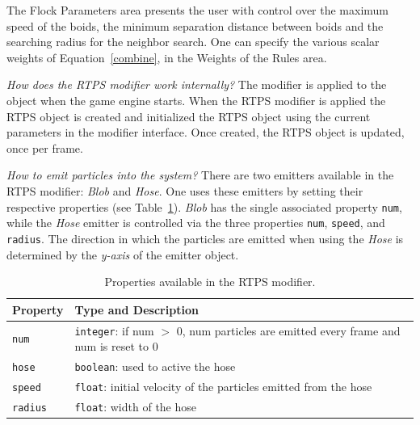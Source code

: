 The Flock Parameters area presents the user with control over the maximum speed of the boids, the minimum separation distance between boids and the searching radius for the neighbor search. One can specify the various scalar weights of Equation~\ref{combine}, in the Weights of the Rules area.

\textit{How does the RTPS modifier work internally?} The modifier is applied to the object when the game engine starts. When the RTPS modifier is applied the RTPS object is created and initialized the RTPS object using the current parameters in the modifier interface. Once created, the RTPS object is updated, once per frame. 

\textit{How to emit particles into the system?} There are two emitters available in the RTPS modifier: \textit{Blob} and \textit{Hose}. One uses these emitters by setting their respective properties (see Table~\ref{properties}). \textit{Blob} has the single associated property \texttt{num}, while the \textit{Hose} emitter is controlled via the three properties \texttt{num}, \texttt{speed}, and \texttt{radius}. The direction in which the particles are emitted when using the \textit{Hose} is determined by the \textit{y-axis} of the emitter object. 

\begin{table}[htdp]
\caption{Properties available in the RTPS modifier.}
\begin{center}
\begin{tabular}{|p{3cm}|p{9cm}|}
\hline 
\textbf{Property} & \textbf{Type and Description} \\\hline 
\texttt{num} 	& \texttt{integer}: if num $>$ 0, num particles are emitted every frame and num is reset to 0	\\\hline 
\texttt{hose}	& \texttt{boolean}: used to active the hose	\\\hline
\texttt{speed}	& \texttt{float}: initial velocity of the particles emitted from the hose	\\\hline
\texttt{radius}	& \texttt{float}: width of the hose	\\ %
\hline 
\end{tabular}
\end{center}
\label{properties}
\end{table}

